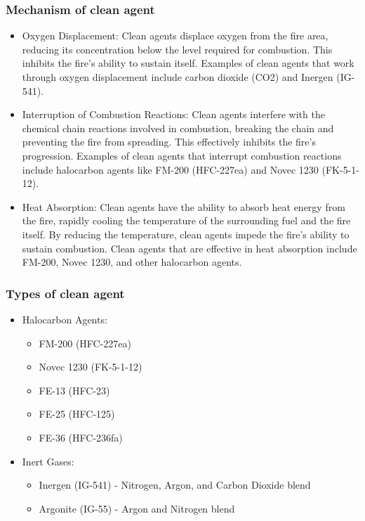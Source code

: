 \documentclass{article}
\begin{document}
\subsubsection*{Mechanism of clean agent}
\begin{itemize}
  \item Oxygen Displacement: Clean agents displace oxygen from the fire area, reducing its concentration below the level required for combustion. This inhibits the fire's ability to sustain itself. Examples of clean agents that work through oxygen displacement include carbon dioxide (CO2) and Inergen (IG-541).

  \item Interruption of Combustion Reactions: Clean agents interfere with the chemical chain reactions involved in combustion, breaking the chain and preventing the fire from spreading. This effectively inhibits the fire's progression. Examples of clean agents that interrupt combustion reactions include halocarbon agents like FM-200 (HFC-227ea) and Novec 1230 (FK-5-1-12).
  
  \item Heat Absorption: Clean agents have the ability to absorb heat energy from the fire, rapidly cooling the temperature of the surrounding fuel and the fire itself. By reducing the temperature, clean agents impede the fire's ability to sustain combustion. Clean agents that are effective in heat absorption include FM-200, Novec 1230, and other halocarbon agents.
\end{itemize}


\subsubsection*{Types of clean agent}
\begin{itemize}
  \item Halocarbon Agents:
  \begin{itemize}
    \item FM-200 (HFC-227ea)
    \item Novec 1230 (FK-5-1-12)
    \item FE-13 (HFC-23)
    \item FE-25 (HFC-125)
    \item FE-36 (HFC-236fa)
  \end{itemize}
  
  \item  Inert Gases:
  \begin{itemize}
    \item Inergen (IG-541) - Nitrogen, Argon, and Carbon Dioxide blend
    \item Argonite (IG-55) - Argon and Nitrogen blend
  \end{itemize}
  
\end{itemize}
\end{document}

